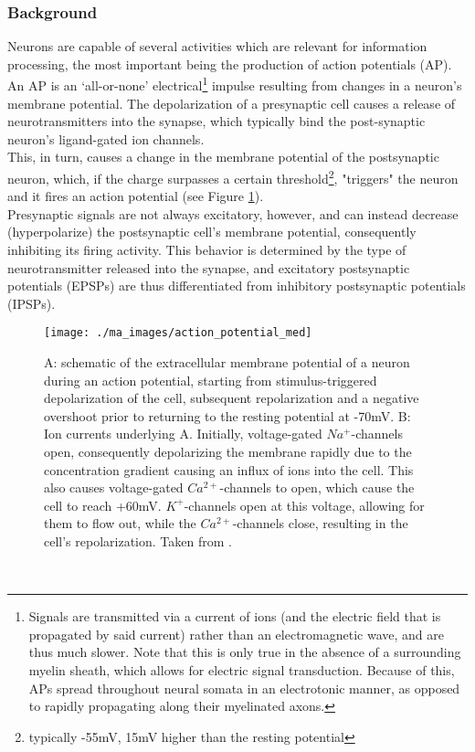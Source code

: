 \documentclass[titlepage]{article}
\begin{document}
\subsubsection{Background}
Neurons are capable of several activities which are relevant for information processing,
the most important being the production of action potentials (AP)\cite{dayan_theoretical_2001}.
An AP is an ‘all-or-none’ electrical\footnote{Signals are transmitted via a current of ions (and the electric field that is propagated by said current) rather than an electromagnetic wave, and are thus much slower\cite{schmidt_physiologie_2007}. Note that this is only true in the absence of a surrounding myelin sheath, which allows for electric signal transduction\cite{schmidt_physiologie_2007}. Because of this, APs spread throughout neural somata in an electrotonic manner, as opposed to rapidly propagating along their myelinated axons\cite{schmidt_physiologie_2007}.} impulse resulting from changes in a neuron’s membrane potential.
The depolarization of a presynaptic cell causes a release of neurotransmitters into the synapse, which typically bind the post-synaptic neuron's ligand-gated ion channels.\\
This, in turn, causes a change in the membrane potential of the postsynaptic neuron, which, if the charge surpasses a certain threshold\footnote{typically -55mV\cite{loffler_biochemie_1998}, 15mV higher than the resting potential}, "triggers" the neuron and it fires an action potential (see Figure \ref{fig:action_potential_med}).\\
Presynaptic signals are not always excitatory, however, and can instead decrease (hyperpolarize) the postsynaptic cell's membrane potential, consequently inhibiting its firing activity\cite{purves_ion_2001}. This behavior is determined by the type of neurotransmitter released into the synapse, and excitatory postsynaptic potentials (EPSPs) are thus differentiated from inhibitory postsynaptic potentials (IPSPs).
\begin{figure}[h]
\centering
\texttt{[image: ./ma\_images/action\_potential\_med]}
\caption{A: schematic of the extracellular membrane potential of a neuron during an action potential, starting from stimulus-triggered depolarization of the cell, subsequent repolarization and a negative overshoot prior to returning to the resting potential at -70mV.\newline
B: Ion currents underlying A. Initially, voltage-gated $Na^{+}$-channels open, consequently depolarizing the membrane rapidly due to the concentration gradient causing an influx of ions into the cell. This also causes voltage-gated $Ca^{2+}$-channels to open, which cause the cell to reach +60mV. $K^{+}$-channels open at this voltage, allowing for them to flow out, while the $Ca^{2+}$-channels close, resulting in the cell's repolarization. Taken from \citeauthor{bahar_er_2016}\cite{bahar_er_2016}.}
 \label{fig:action_potential_med}
\end{figure}\\
\end{document}
